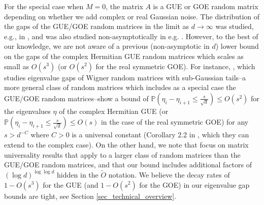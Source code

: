 \documentclass[11pt,letterpaper]{article}
\begin{document}
For the special case when $M=0$, the matrix $A$ is a GUE or GOE random matrix depending on whether we add complex or real Gaussian noise.   
%
 The distribution of the gaps of the GUE/GOE random matrices in the limit as $d \rightarrow \infty$ was studied, e.g., in \cite{dyson1963random, tao2013asymptotic, arous2013extreme}, and was also studied non-asymptotically in e.g. \cite{nguyen2017random}.
%
However, to the best of our knowledge, we are not aware of a previous (non-asymptotic in $d$) lower bound on the gaps of the complex Hermitian GUE random matrices which scales as small as $O(s^3)$ (or  $O(s^2)$ for the real symmetric GOE).
%
For instance, \cite{nguyen2017random}, which studies eigenvalue gaps of Wigner random matrices with sub-Gaussian tails--a more general class of random matrices which includes as a special case the GUE/GOE random matrices--show a bound of $\mathbb{P}\left(\eta_i- \eta_{i+1} \leq \frac{s}{\sqrt{d}}\right) \leq O(s^2)$ for the eigenvalues $\eta$ of the complex Hermitian GUE (or $\mathbb{P}\left(\eta_i- \eta_{i+1} \leq \frac{s}{\sqrt{d}}\right)  \leq O(s)$ in the case of the real symmetric GOE) for any  $s> d^{-C}$ where $C>0$ is a universal constant (Corollary 2.2 in \cite{nguyen2017random}, which they can extend to the complex case).
%
On the other hand, we note that \cite{nguyen2017random} focus on matrix universality results that apply to a larger class of  random matrices than the GUE/GOE random matrices,
and that our bound includes additional factors of $(\log d)^{\log \log d}$ hidden in the $\tilde{O}$ notation.
%
We believe the decay rates of $1- O(s^3)$ for the GUE (and $1- O(s^2)$ for the GOE) in our eigenvalue gap bounds are tight, see Section \ref{sec_technical_overview}.
\end{document}
